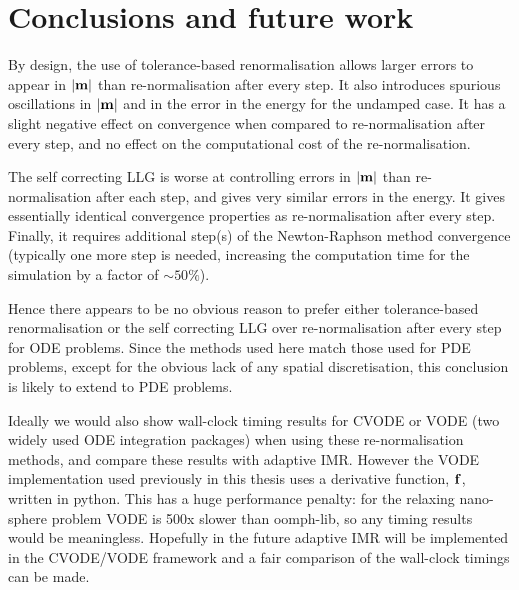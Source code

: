 \section{Conclusions and future work}

By design, the use of tolerance-based renormalisation allows larger errors to appear in $\left|{\boldsymbol{\mathrm{m}}} \right|$ than re-normalisation after every step.
It also introduces spurious oscillations in $\left|{\boldsymbol{\mathrm{m}}} \right|$ and in the error in the energy for the undamped case.
It has a slight negative effect on convergence when compared to re-normalisation after every step, and no effect on the computational cost of the re-normalisation.

The self correcting LLG is worse at controlling errors in $\left|{\boldsymbol{\mathrm{m}}} \right|$ than re-normalisation after each step, and gives very similar errors in the energy.
It gives essentially identical convergence properties as re-normalisation after every step.
Finally, it requires additional step(s) of the Newton-Raphson method convergence (typically one more step is needed, increasing the computation time for the simulation by a factor of $\sim 50\%$).

Hence there appears to be no obvious reason to prefer either tolerance-based renormalisation or the self correcting LLG over re-normalisation after every step for ODE problems.
Since the methods used here match those used for PDE problems, except for the obvious lack of any spatial discretisation, this conclusion is likely to extend to PDE problems.

Ideally we would also show wall-clock timing results for CVODE or VODE (two widely used ODE integration packages) when using these re-normalisation methods, and compare these results with adaptive IMR.
However the VODE implementation used previously in this thesis uses a derivative function, ${\boldsymbol{\mathrm{f}}}$, written in python.
This has a huge performance penalty: for the relaxing nano-sphere problem VODE is 500x slower than oomph-lib, so any timing results would be meaningless.
Hopefully in the future adaptive IMR will be implemented in the CVODE/VODE framework and a fair comparison of the wall-clock timings can be made.

